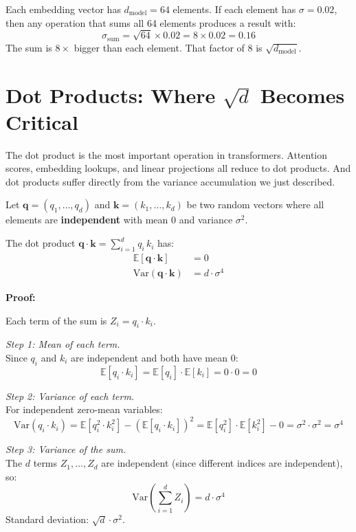 \documentclass[11pt, a4paper]{article}
\begin{document}
\begin{application}
Each embedding vector has $d_\text{model} = 64$ elements. If each element has
$\sigma = 0.02$, then any operation that sums all 64 elements produces a result with:
\[
\sigma_\text{sum} = \sqrt{64} \times 0.02 = 8 \times 0.02 = 0.16
\]
The sum is $8\times$ bigger than each element. That factor of 8 is $\sqrt{d_\text{model}}$.
\end{application}


\section{Dot Products: Where $\sqrt{d}$ Becomes Critical}

The dot product is the most important operation in transformers. Attention scores, embedding
lookups, and linear projections all reduce to dot products. And dot products suffer directly
from the variance accumulation we just described.

\begin{formaldef}
Let $\bm{q} = (q_1, \ldots, q_d)$ and $\bm{k} = (k_1, \ldots, k_d)$ be two random vectors
where all elements are \textbf{independent} with mean $0$ and variance $\sigma^2$.

The dot product $\bm{q} \cdot \bm{k} = \sum_{i=1}^{d} q_i \, k_i$ has:
\begin{align*}
\mathbb{E}[\bm{q} \cdot \bm{k}] &= 0 \\[6pt]
\text{Var}(\bm{q} \cdot \bm{k}) &= d \cdot \sigma^4
\end{align*}

\medskip
\noindent \textbf{Proof:}

Each term of the sum is $Z_i = q_i \cdot k_i$.

\noindent \emph{Step 1: Mean of each term.}\\
Since $q_i$ and $k_i$ are independent and both have mean 0:
\[
\mathbb{E}[q_i \cdot k_i] = \mathbb{E}[q_i] \cdot \mathbb{E}[k_i] = 0 \cdot 0 = 0
\]

\noindent \emph{Step 2: Variance of each term.}\\
For independent zero-mean variables:
\[
\text{Var}(q_i \cdot k_i) = \mathbb{E}[q_i^2 \cdot k_i^2] - (\mathbb{E}[q_i \cdot k_i])^2
= \mathbb{E}[q_i^2] \cdot \mathbb{E}[k_i^2] - 0
= \sigma^2 \cdot \sigma^2 = \sigma^4
\]

\noindent \emph{Step 3: Variance of the sum.}\\
The $d$ terms $Z_1, \ldots, Z_d$ are independent (since different indices are independent), so:
\[
\text{Var}\!\left(\sum_{i=1}^{d} Z_i\right) = d \cdot \sigma^4
\]
Standard deviation: $\sqrt{d} \cdot \sigma^2$.
\end{formaldef}
\end{document}
